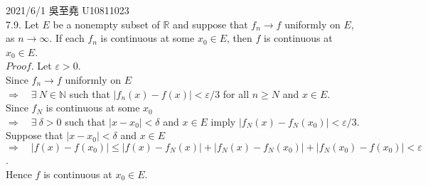 \documentclass[12pt]{book}
\author{andersonwu2000}
\begin{document}
\begin{CJK}{UTF8}{bsmi}

\hfill 2021/6/1 吳至堯 U10811023 \\

7.9. Let $E$ be a nonempty subset of $\mathbb{R}$ and suppose that $f_n\rightarrow f$ uniformly on $E$, as $n\rightarrow\infty$. If each $f_n$ is continuous at some $x_0\in E$, then $f$ is continuous at $x_0\in E$. \\
$Proof$. Let $\varepsilon>0$. \\
Since $f_n\rightarrow f$ uniformly on $E$ \\
$\Rightarrow\quad\exists\ N\in\mathbb{N}$ such that $|f_n(x)-f(x)|<\varepsilon/3$ for all $n\ge N$ and $x\in E$. \\
Since $f_N$ is continuous at some $x_0$ \\
$\Rightarrow\quad\exists\ \delta>0$ such that $|x-x_0|<\delta$ and $x\in E$ imply $|f_N(x)-f_N(x_0)|<\varepsilon/3$. \\
Suppose that $|x-x_0|<\delta$ and $x\in E$ \\
$\Rightarrow\quad|f(x)-f(x_0)|
\le|f(x)-f_N(x)|+|f_N(x)-f_N(x_0)|+|f_N(x_0)-f(x_0)|
<\varepsilon$.  \\
Hence $f$ is continuous at $x_0\in E$. \\


\end{CJK}
\end{document}
